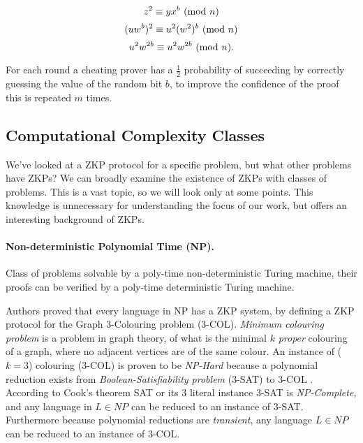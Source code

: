 $$z^2 \equiv yx^b \ (\mathrm{mod}\ n)$$
$$(uw^b)^2 \equiv u^2(w^2)^b \ (\mathrm{mod}\ n)$$
$$u^2w^{2b} \equiv u^2w^{2b} \ (\mathrm{mod}\ n).$$

\noindent For each round a cheating prover has a $\frac{1}{2}$ probability of succeeding by correctly guessing the value of the random bit $b$, to improve the confidence of the proof this is repeated $m$ times.


\subsection{Computational Complexity Classes}
We've looked at a ZKP protocol for a specific problem, but what other problems have ZKPs?
We can broadly examine the existence of ZKPs with classes of problems. This is a vast topic, so we will look only at some points. 
This knowledge is unnecessary for understanding the focus of our work, but offers an interesting background of ZKPs.

\paragraph{Non-deterministic Polynomial Time (NP).}
Class of problems solvable by a poly-time non-deterministic Turing machine, their proofs can be verified by a poly-time deterministic Turing machine.

Authors \cite{GMW} proved that every language in NP has a ZKP system, by defining a ZKP protocol for the Graph 3-Colouring problem (3-COL).
\textit{Minimum colouring problem} is a problem in graph theory, of what is the minimal $k$ \textit{proper} colouring of a graph, where no adjacent vertices are of the same colour.
An instance of ($k=3$) colouring (3-COL) is proven to be \textit{NP-Hard} because a polynomial reduction exists from \textit{Boolean-Satisfiability problem} (3-SAT) to 3-COL \cite{moore2011nature}.
According to Cook's theorem \cite{cook1971complexity} SAT or its 3 literal instance 3-SAT is \textit{NP-Complete}, and any language in $L \in NP$ can be reduced to an instance of 3-SAT. 
Furthermore because polynomial reductions are \textit{transient}, any language $L \in NP$ can be reduced to an instance of 3-COL.